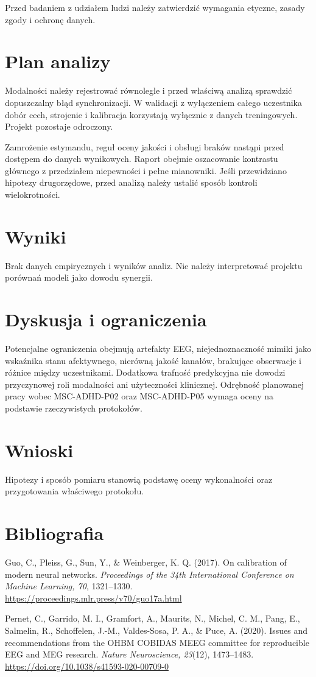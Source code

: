 \documentclass[11pt,a4paper]{article}
\begin{document}
Przed badaniem z udziałem ludzi należy zatwierdzić wymagania etyczne, zasady zgody i ochronę danych.

\section{Plan analizy}

Modalności należy rejestrować równolegle i przed właściwą analizą sprawdzić dopuszczalny błąd synchronizacji. W walidacji z wyłączeniem całego uczestnika dobór cech, strojenie i kalibracja korzystają wyłącznie z danych treningowych. Projekt pozostaje odroczony.

Zamrożenie estymandu, reguł oceny jakości i obsługi braków nastąpi przed dostępem do danych wynikowych. Raport obejmie oszacowanie kontrastu głównego z przedziałem niepewności i pełne mianowniki. Jeśli przewidziano hipotezy drugorzędowe, przed analizą należy ustalić sposób kontroli wielokrotności.

\section{Wyniki}
Brak danych empirycznych i wyników analiz. Nie należy interpretować projektu porównań modeli jako dowodu synergii.

\section{Dyskusja i ograniczenia}
Potencjalne ograniczenia obejmują artefakty EEG, niejednoznaczność mimiki jako wskaźnika stanu afektywnego, nierówną jakość kanałów, brakujące obserwacje i różnice między uczestnikami. Dodatkowa trafność predykcyjna nie dowodzi przyczynowej roli modalności ani użyteczności klinicznej. Odrębność planowanej pracy wobec MSC-ADHD-P02 oraz MSC-ADHD-P05 wymaga oceny na podstawie rzeczywistych protokołów.

\section{Wnioski}

Hipotezy i sposób pomiaru stanowią podstawę oceny wykonalności oraz przygotowania właściwego protokołu.

\section*{Bibliografia}

{\setlength{\parindent}{0pt}
\setlength{\parskip}{5pt}
\hangindent=1.27cm
Guo, C., Pleiss, G., Sun, Y., \& Weinberger, K. Q. (2017). On calibration of modern neural networks. \textit{Proceedings of the 34th International Conference on Machine Learning, 70}, 1321--1330. \url{https://proceedings.mlr.press/v70/guo17a.html}\par
\hangindent=1.27cm
Pernet, C., Garrido, M. I., Gramfort, A., Maurits, N., Michel, C. M., Pang, E., Salmelin, R., Schoffelen, J.-M., Valdes-Sosa, P. A., \& Puce, A. (2020). Issues and recommendations from the OHBM COBIDAS MEEG committee for reproducible EEG and MEG research. \textit{Nature Neuroscience, 23}(12), 1473--1483. \url{https://doi.org/10.1038/s41593-020-00709-0}\par
}
\end{document}
